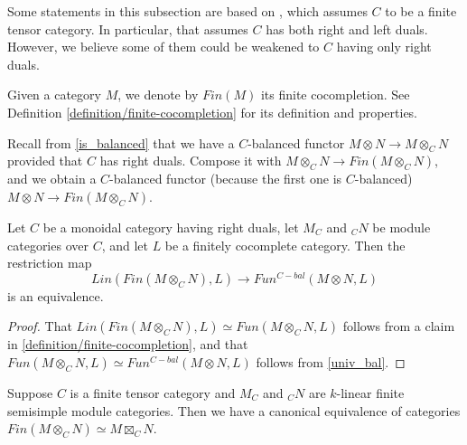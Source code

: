 \begin{remark}
  Some statements in this subsection are based
  on \cite{douglas/balanced-product}, which assumes $C$ to be a finite tensor
  category. In particular, that assumes $C$ has both right and left duals.
  However, we believe some of them could be weakened to $C$ having only right
  duals.
\end{remark}

\begin{notation}
  Given a category $M$, we denote by $Fin(M)$ its finite cocompletion. See
  Definition \ref{definition/finite-cocompletion} for its definition and
  properties.
\end{notation}

Recall from \ref{is_balanced} that we have a $C$-balanced functor $M\otimes
N \to M\otimes_C N$ provided that $C$ has right duals. Compose it with
$M\otimes_C N \to Fin(M\otimes_C N)$, and we obtain a $C$-balanced functor
(because the first one is $C$-balanced) $M\otimes N\to Fin(M\otimes_C N)$.

\begin{lemma}\label{univ_finbal}

  \noindent Let $C$ be a monoidal category having right duals, let $M_C$ and $_{C}N$ be
  module categories over $C$, and let $L$ be a finitely cocomplete category.
  Then the restriction map $$Lin(Fin(M\otimes_C N),L)\to Fun^{C-bal}(M\otimes
  N,L)$$ is an equivalence.
\end{lemma}

\begin{proof}
  That $Lin(Fin(M\otimes_C N),L) \simeq Fun(M \otimes_{C} N, L)$ follows from
  a claim in \ref{definition/finite-cocompletion}, and that $Fun(M \otimes_{C}
  N, L) \simeq Fun^{C-bal}(M \otimes N, L)$ follows from \ref{univ_bal}.
\end{proof}

\begin{proposition}\label{fin_eq_bal}

  Suppose $C$ is a finite tensor category and $M_C$ and $_{C}N$ are $k$-linear
  finite semisimple module categories. Then we have a canonical equivalence of
  categories $Fin(M\otimes_C N) \simeq M\boxtimes_C N$.
    
\end{proposition}


